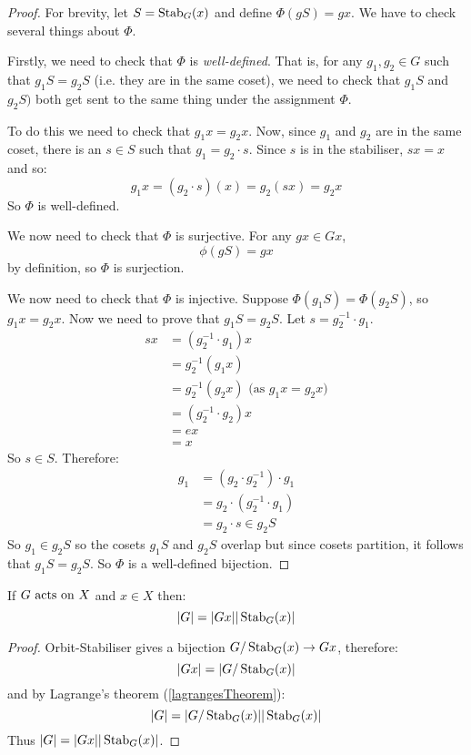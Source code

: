 \documentclass[../main.tex]{subfiles}
\begin{document}
\begin{proof}
  For brevity, let $S = \operatorname{Stab}_G(x)$ and define $\Phi(gS) = gx$.
  We have to check several things about $\Phi$.

  Firstly, we need to check that $\Phi$ is \textit{well-defined}.
  That is, for any $g_1, g_2 \in G$ such that $g_1S = g_2S$ (i.e. they are in the same coset), we need to check that $g_1S$ and $g_2S)$ both get sent to the same thing under the assignment $\Phi$.

  To do this we need to check that $g_1x = g_2x$.
  Now, since $g_1$ and $g_2$ are in the same coset, there is an $s \in S$ such that $g_1 = g_2 \cdot s$.
  Since $s$ is in the stabiliser, $sx = x$ and so:
  \[
    g_1x = (g_2 \cdot s)(x) = g_2(sx) = g_2 x
  \]
  So $\Phi$ is well-defined.

  We now need to check that $\Phi$ is surjective.
  For any $gx \in Gx$,
  \[
    \phi(gS) = gx
  \]
  by definition, so $\Phi$ is surjection.

  We now need to check that $\Phi$ is injective.
  Suppose $\Phi(g_1S) = \Phi(g_2S)$, so $g_1x = g_2x$.
  Now we need to prove that $g_1S = g_2S$.
  Let $s = g^{-1}_{2} \cdot g_1$.
  \begin{align*}
    sx &= (g^{-1}_{2} \cdot g_1)x \\
       &= g^{-1}_{2}(g_1 x) \\
       &= g^{-1}_{2}(g_2 x) \text{ (as $g_1x = g_2x$)}\\
       &= (g^{-1}_{2} \cdot g_2)x \\
       &= ex \\
       &=x
  \end{align*}
  So $s \in S$.
  Therefore:
  \begin{align*}
    g_1 &= (g_2 \cdot g^{-1}_{2}) \cdot g_1 \\
        &= g_2 \cdot (g^{-1}_{2} \cdot g_1) \\
        &= g_2 \cdot s \in g_2S
  \end{align*}
  So $g_1 \in g_2S$ so the cosets $g_1S$ and $g_2S$ overlap but since cosets partition, it follows that $g_1S = g_2S$.
  So $\Phi$ is a well-defined bijection.
\end{proof}
\begin{corollary}
  If $G \text{ acts on } X$ and $x \in X$ then:
  \[
    |G| = |Gx||\operatorname{Stab}_G(x)|
  \]
\end{corollary}
\begin{proof}
  Orbit-Stabiliser gives a bijection $G/\operatorname{Stab}_G(x) \to Gx$, therefore:
  \[
    |Gx| = |G / \operatorname{Stab}_G(x)|
  \]
  and by Lagrange's theorem (\cref{lagrangesTheorem}):
  \[
    |G| = |G/\operatorname{Stab}_G(x)||\operatorname{Stab}_G(x)|
  \]
  Thus $|G| = |Gx||\operatorname{Stab}_G(x)|$.
\end{proof}
\end{document}

